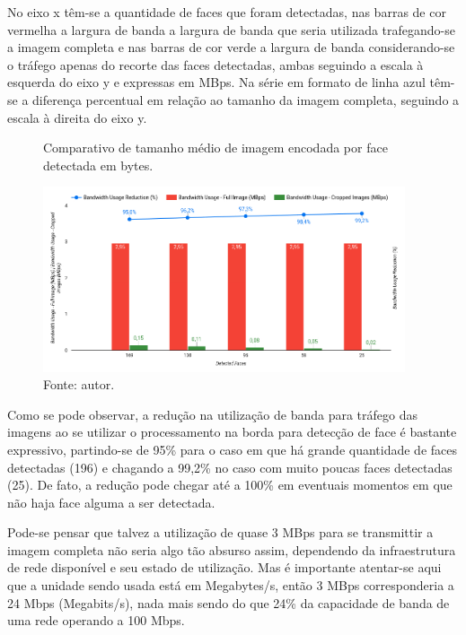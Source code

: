 No eixo x têm-se a quantidade de faces que foram detectadas, nas barras de cor vermelha a largura de banda a largura de banda que seria utilizada trafegando-se a imagem completa e nas barras de cor verde a largura de banda considerando-se o tráfego apenas do recorte das faces detectadas, ambas seguindo a escala à esquerda do eixo y e expressas em MBps. Na série em formato de linha azul têm-se a diferença percentual em relação ao tamanho da imagem completa, seguindo a escala à direita do eixo y.

\begin{figure}
    \centering
    \caption[Comparativo de tamanho médio de imagem encodada por face detectada em bytes.]{Comparativo de tamanho médio de imagem encodada por face detectada em bytes.}
    \includegraphics[width=0.95\textwidth]{Cap4_Experimentos_Realizados/Figures/cena1_comparativo_utilizacao_banda.jpg}
    \caption*{Fonte: autor.}
    \label{fig:cena1_comparativo_utilizacao_banda}
\end{figure}

Como se pode observar, a redução na utilização de banda para tráfego das imagens ao se utilizar o processamento na borda para detecção de face é bastante expressivo, partindo-se de 95\% para o caso em que há grande quantidade de faces detectadas (196) e chagando a 99,2\% no caso com muito poucas faces detectadas (25). De fato, a redução pode chegar até a 100\% em eventuais momentos em que não haja face alguma a ser detectada.

Pode-se pensar que talvez a utilização de quase 3 MBps para se transmittir a imagem completa não seria algo tão absurso assim, dependendo da infraestrutura de rede disponível e seu estado de utilização. Mas é importante atentar-se aqui que a unidade sendo usada está em Megabytes/s, então 3 MBps corresponderia a 24 Mbps (Megabits/s), nada mais sendo do que 24\% da capacidade de banda de uma rede operando a 100 Mbps.

